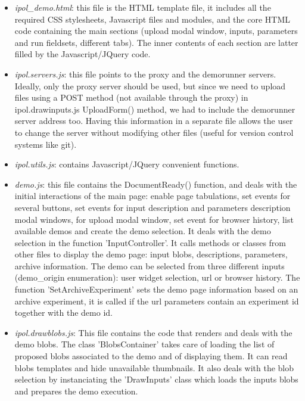 \begin{itemize}

 \item \emph{ipol\_demo.html}: this file is the HTML template file, it includes all the
  required CSS stylesheets, Javascript files and modules, and the core HTML
  code containing the main sections (upload modal window, inputs, parameters and 
  run fieldsets, different tabs). The inner contents of each section are latter
  filled by the Javascript/JQuery code.

 \item \emph{ipol.servers.js}: this file points to the proxy and the demorunner
  servers. Ideally, only the proxy server should be used, but since we need to upload
  files using a POST method (not available through the proxy) in ipol.drawinputs.js 
  UploadForm() method, we had to include the demorunner server address too.
  Having this information in a separate file allows the user to change the server
  without modifying other files (useful for version control systems like git).

 \item \emph{ipol.utils.js}: contains Javascript/JQuery convenient functions.

 \item \emph{demo.js}: this file contains the DocumentReady() function,
  and deals with the initial interactions of the main page: enable page tabu\-lations,
  set events for several buttons, set events for input description and parameters
  description modal windows, for upload modal window, set event for browser history,
  list available demos and create the demo selection. It deals with
  the demo selection in the function 'Input\-Controller'. It calls methods or classes
  from other files to display the demo page: input blobs, descriptions, parameters,
  archive information. 
  The demo can be selected
  from three different inputs (demo\_origin enumeration): user widget selection,
  url or browser history. The function 'Set\-Archive\-Experiment' sets the demo
  page information based on an archive experiment, it is called if the url parameters
  contain an experiment id together with the demo id.


 \item \emph{ipol.drawblobs.js}: This file contains the code that renders and 
  deals with the demo blobs. The class 'BlobsContainer' takes care of loading
  the list of proposed blobs associated to the demo and of displaying them.
  It can read blobs templates and hide unavailable thumbnails. It also
  deals with the blob selection by instanciating the 'DrawInputs' class which loads
  the inputs blobs and prepares the demo execution.


\end{itemize}
